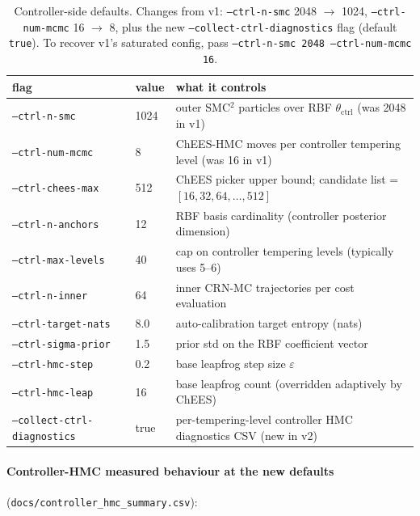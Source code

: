 \documentclass[11pt,a4paper]{article}
\begin{document}
\begin{table}[ht]
\centering
\small
\begin{tabular}{lll}
\toprule
flag & value & what it controls \\
\midrule
\texttt{--ctrl-n-smc}        & 1024 & outer SMC$^2$ particles over RBF $\theta_{\mathrm{ctrl}}$ (was 2048 in v1) \\
\texttt{--ctrl-num-mcmc}     & 8    & ChEES-HMC moves per controller tempering level (was 16 in v1) \\
\texttt{--ctrl-chees-max}    & 512  & ChEES picker upper bound; candidate list = $[16, 32, 64, \ldots, 512]$ \\
\texttt{--ctrl-n-anchors}    & 12   & RBF basis cardinality (controller posterior dimension) \\
\texttt{--ctrl-max-levels}   & 40   & cap on controller tempering levels (typically uses 5--6) \\
\texttt{--ctrl-n-inner}      & 64   & inner CRN-MC trajectories per cost evaluation \\
\texttt{--ctrl-target-nats}  & 8.0  & auto-calibration target entropy (nats) \\
\texttt{--ctrl-sigma-prior}  & 1.5  & prior std on the RBF coefficient vector \\
\texttt{--ctrl-hmc-step}     & 0.2  & base leapfrog step size $\varepsilon$ \\
\texttt{--ctrl-hmc-leap}     & 16   & base leapfrog count (overridden adaptively by ChEES) \\
\texttt{--collect-ctrl-diagnostics} & true & per-tempering-level controller HMC diagnostics CSV (new in v2) \\
\bottomrule
\end{tabular}
\caption{Controller-side defaults. Changes from v1:
\texttt{--ctrl-n-smc} 2048 $\to$ 1024,
\texttt{--ctrl-num-mcmc} 16 $\to$ 8, plus the new
\texttt{--collect-ctrl-diagnostics} flag (default \texttt{true}).
To recover v1's saturated config, pass \texttt{--ctrl-n-smc 2048
--ctrl-num-mcmc 16}.}
\label{tab:ctrl_cfg}
\end{table}

\paragraph{Controller-HMC measured behaviour at the new defaults}
(\texttt{docs/controller\_hmc\_summary.csv}):
\end{document}
